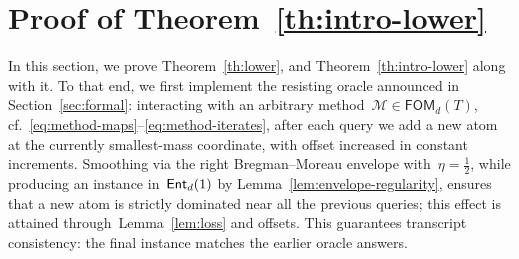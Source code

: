 \documentclass[11pt]{article}
\numberwithin{equation}{section}
\let\le\leqslant
\let\ge\geqslant
\theoremstyle{remark}
\newcommand{\norm}[1]{\left\lVert #1\right\rVert}
\newcommand{\abs}[1]{\lvert #1\rvert}
\newcommand{\supp}{\operatorname{supp}}
\newcommand{\Env}{S}
\newcommand{\Ent}{\textup{\textsf{Ent}}}
\newcommand{\Mtd}{\mathscr{M}}
\newcommand{\FOM}{\textsf{FOM}}
\let\Div\relax\newcommand{\Div}{D_h}
\newcommand{\Fh}{\Ent_d}
\newcommand{\1}{\mathbf{1}}
\newcommand{\half}{\frac{1}{2}}
\begin{document}

\section{Proof of Theorem~\ref{th:intro-lower}}
\label{sec:proof}
%
In this section, we prove Theorem~\ref{th:lower}, and Theorem~\ref{th:intro-lower} along with it.
To that end, we first implement the resisting oracle announced in Section~\ref{sec:formal}: interacting with an arbitrary method~$\Mtd\in\FOM_d(T)$, cf.~\eqref{eq:method-maps}--\eqref{eq:method-iterates}, after each query we add a new atom at the currently smallest-mass coordinate, with offset increased in constant increments. 
Smoothing via the right Bregman--Moreau envelope with~$\eta = \half$, while producing an instance in~$\Fh(1)$ by Lemma~\ref{lem:envelope-regularity}, ensures that a new atom is strictly dominated near all the previous queries; this effect is attained through~Lemma~\ref{lem:loss} and offsets. 
This guarantees transcript consistency: the final instance matches the earlier oracle answers.

\end{document}
